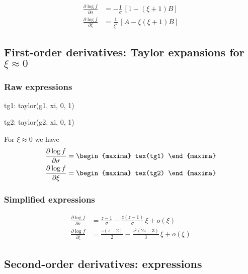 {\color{red}
\begin{align*}
  \frac{\partial \log f}{\partial \sigma}
  &= - \frac{1}{\sigma}\, \left[1 - (\xi + 1) B \right]\\
  \frac{\partial \log f}{\partial \xi}
  &= \frac{1}{\xi^2} \, \left[A - \xi (\xi +1) B \right]
\end{align*}
}


\subsection{First-order derivatives: Taylor expansions for $\xi \approx 0$}
\subsubsection*{Raw expressions}
\begin{maxima}
  tg1: taylor(g1, xi, 0, 1)
\end{maxima}
\begin{maxima}
  tg2: taylor(g2, xi, 0, 1)
\end{maxima}
For $\xi \approx  0$ we have
{\color{MonVertF}
\begin{align*}
  \frac{\partial \log f}{\partial \sigma} &=
\begin{maxima}
  tex(tg1)
\end{maxima} \\
\frac{\partial \log f}{\partial \xi} &=
\begin{maxima}
  tex(tg2)
\end{maxima}
\end{align*}
}

\subsubsection*{Simplified expressions}
{\color{red}
  \begin{align*}
    \frac{\partial \log f}{\partial \sigma}
    &= \frac{z - 1}{\sigma} - \frac{z (z - 1)}{\sigma} \,\xi + o(\xi) \\
    \frac{\partial \log f}{\partial \xi}
    &=  \frac{z(z - 2)}{2} - \frac{z^2(2z - 3)}{3}\, \xi + o(\xi) 
  \end{align*}
}
  
\subsection{Second-order derivatives: expressions}

